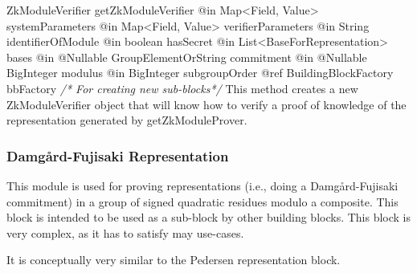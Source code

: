       \begin{method}
      {ZkModuleVerifier}
      {getZkModuleVerifier}
      {
        {@in Map<Field, Value> systemParameters}
        {@in Map<Field, Value> verifierParameters}
        {@in String identifierOfModule}
        {@in boolean hasSecret}
        {@in List<BaseForRepresentation> bases}
        {@in @Nullable GroupElementOrString commitment}
        {@in @Nullable BigInteger modulus}
        {@in BigInteger subgroupOrder}
        {@ref BuildingBlockFactory bbFactory \textrm{\emph{/* For creating new sub-blocks*/}}}
      }
      This method creates a new ZkModuleVerifier object that will know how to
      verify a proof of knowledge of the representation generated by getZkModuleProver.
      \end{method}

    \subsubsection{Damg\aa{}rd-Fujisaki Representation}

    This module is used for proving representations
    (i.e., doing a Damg\aa{}rd-Fujisaki commitment) in a group of
    signed quadratic residues modulo a composite.
    This block is intended to be used as a sub-block by other building
    blocks. This block is very complex, as it has to satisfy may use-cases.

    It is conceptually very similar to the Pedersen representation block.

